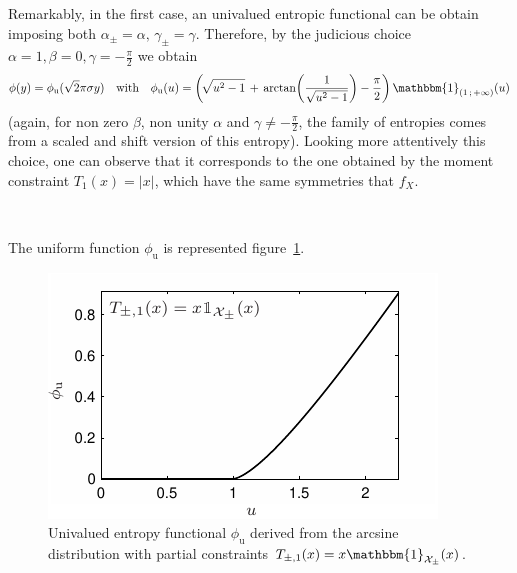 \documentclass[entropy,article,submit,moreauthors,pdftex]{Definitions/mdpi}
\newcommand{\SZ}[1]{{\color{blue} #1}}                                       %
\newcommand{\jfb}[1]{{\color{red} #1}}                                       %
\def\X{\mathcal{X}}%
\def\un{\mathbbm{1}}%
\begin{document}
{Remarkably, in  the first case, an  univalued entropic functional can  be obtain
imposing both $\alpha_\pm  = \alpha, \, \gamma_\pm = \gamma$.  Therefore, by the
judicious choice  $\alpha =  1, \beta  = 0, \gamma  = -\frac{\pi}{2}$  we obtain
%
\[
\phi(y) = \phi_{\mathrm{u}}(\sqrt2
\pi \sigma y) \quad \mbox{with} \quad \phi_{\mathrm{u}}(u) =
\left( \! \sqrt{u^2  - 1} \,  + \,  \arctan\left( \frac{1}{\sqrt{u^2 -  1}} \right)
 - \frac{\pi}{2} \right) \, \un_{\left( 1 \, ; \, +\infty \right)}(u)
\]
%
(again,  for   non  zero  $\beta$,  non   unity  $\alpha$  and  $\gamma   \ne  -
\frac{\pi}{2}$, the family of entropies comes from a scaled and shift version of
this entropy).  Looking more attentively  this choice,  one can observe  that it
corresponds to the  one obtained by the moment constraint  $T_1(x) = |x|$, which
have the same symmetries that $f_X$.}

\

The      uniform      function      $\phi_{\mathrm{u}}$      is      represented
figure~\ref{fig:Entropy-arcsin}.
 
\begin{figure}[htbp]
  \begin{minipage}{.6\columnwidth}
    \centerline{\includegraphics[width=.9\textwidth]{PDF/MaxEnt_ArcsineLaw}}
  \end{minipage}
  \begin{minipage}{.4\columnwidth}
\caption{\SZ{Univalued e}ntropy  functional   $\phi_{\mathrm{u}}$  derived  from   the  arcsine
  distribution with partial constraints $T_{\pm,1}(x) = x \un_{\X_\pm}(x)$.}
\label{fig:Entropy-arcsin}
  \end{minipage}
\end{figure}
\end{document}
